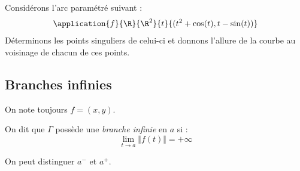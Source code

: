 \documentclass[french,11pt,twoside]{VcCours}
\begin{document}
\medskip

\begin{Exemple} Considérons l'arc paramétré suivant :
\[\application{f}{\R}{\R^2}{t}{(t^2+ \cos(t), t- \sin(t))}\]
Déterminons les points singuliers de celui-ci et donnons l'allure de la courbe au voisinage de chacun de ces points.

\end{Exemple}

\newpage
\subsection{Branches infinies}
On note toujours $f=(x,y)$.

\begin{Definition}{} On dit que $\Gamma$ possède une \emph{branche infinie} en $a$ si :
$$ \lim_{t \rightarrow a} \Vert f(t) \Vert = + \infty$$
\end{Definition}

\begin{Remarque}{} On peut distinguer $a^{-}$ et $a^{+}$.
\end{Remarque}

\medskip
\end{document}
